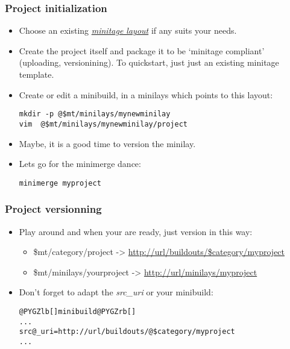 \documentclass[letterpaper,10pt,english]{sphinxmanual}
\begin{document}
\subsubsection{Project initialization}
\label{usecases/begin_project:project-initialization}\begin{itemize}
\item {} 
Choose an existing  {\hyperref[paster/index:minitageprojects]{\emph{minitage layout}}} if any suits your needs.

\item {} 
Create the project itself and package it to be `minitage compliant'
(uploading, versionining). To quickstart, just just an existing minitage template.

\item {} 
Create or edit a minibuild, in a minilays  which points to this layout:

\begin{Verbatim}[commandchars=@\[\]]
mkdir -p @$mt/minilays/mynewminilay
vim  @$mt/minilays/mynewminilay/project
\end{Verbatim}

\item {} 
Maybe, it is a good time to version the minilay.

\item {} 
Lets go for the minimerge dance:

\begin{Verbatim}[commandchars=@\[\]]
minimerge myproject
\end{Verbatim}

\end{itemize}


\subsubsection{Project versionning}
\label{usecases/begin_project:versioning-project}\label{usecases/begin_project:project-versionning}\begin{itemize}
\item {} 
Play around and when your are ready, just version in this way:
\begin{itemize}
\item {} 
\$mt/category/project      -\textgreater{} \href{http://url/buildouts/\$category/myproject}{http://url/buildouts/\$category/myproject}

\item {} 
\$mt/minilays/yourproject  -\textgreater{} \href{http://url/minilays/myproject}{http://url/minilays/myproject}

\end{itemize}

\item {} 
Don't forget to adapt the \emph{src\_uri} or your minibuild:

\begin{Verbatim}[commandchars=@\[\]]
@PYGZlb[]minibuild@PYGZrb[]
...
src@_uri=http://url/buildouts/@$category/myproject
...
\end{Verbatim}

\end{itemize}
\end{document}
